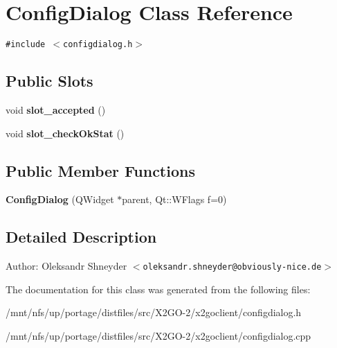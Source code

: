 \section{Config\-Dialog Class Reference}
\label{classConfigDialog}
{\tt \#include $<$configdialog.h$>$}

\subsection*{Public Slots}
\begin{CompactItemize}
\item 
void \textbf{slot\_\-accepted} ()\label{classConfigDialog_9f04d8b7c801f239998cfa628f2183da}

\item 
void \textbf{slot\_\-check\-Ok\-Stat} ()\label{classConfigDialog_6b6b036fe8df7b347fd3772f4e7f6fef}

\end{CompactItemize}
\subsection*{Public Member Functions}
\begin{CompactItemize}
\item 
\textbf{Config\-Dialog} (QWidget $\ast$parent, Qt::WFlags f=0)\label{classConfigDialog_796cb9b0d5b50af3f1d5d31de53e8c69}

\end{CompactItemize}


\subsection{Detailed Description}
\begin{Desc}
\item[Author:]Oleksandr Shneyder $<$\tt{oleksandr.shneyder@obviously-nice.de}$>$ \end{Desc}




The documentation for this class was generated from the following files:\begin{CompactItemize}
\item 
/mnt/nfs/up/portage/distfiles/src/X2GO-2/x2goclient/configdialog.h\item 
/mnt/nfs/up/portage/distfiles/src/X2GO-2/x2goclient/configdialog.cpp\end{CompactItemize}
